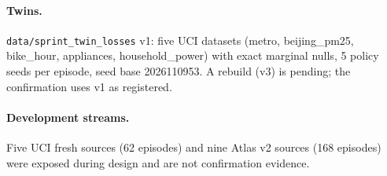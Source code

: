 \paragraph{Twins.} \texttt{data/sprint\_twin\_losses} v1: five UCI datasets (metro, beijing\_pm25,
bike\_hour, appliances, household\_power) with exact marginal nulls, 5 policy seeds per episode, seed
base 2026110953. A rebuild (v3) is pending; the confirmation uses v1 as registered.

\paragraph{Development streams.} Five UCI fresh sources (62 episodes) and nine Atlas v2 sources
(168 episodes) were exposed during design and are not confirmation evidence.
